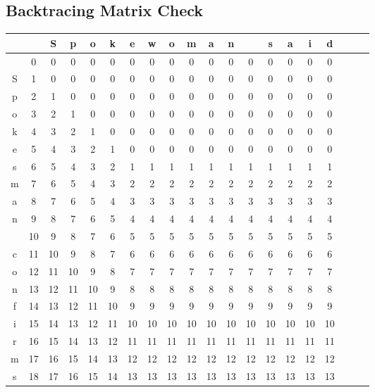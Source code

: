 \subsection{Backtracing Matrix Check}
\begin{tabular}{||c|c c c c c c c c c c c c c c c c |c |c| c|}
\hline
     &     &  S  &  p  &  o  &  k  &  e  &  w  &  o  &  m  &  a  &  n  &     &  s  &  a  &  i  &  d  \\
\hline
\hline
     &  0  &  0  &  0  &  0  &  0  &  0  &  0  &  0  &  0  &  0  &  0  &  0  &  0  &  0  &  0  &  0  \\
  S  &  1  &  0  &  0  &  0  &  0  &  0  &  0  &  0  &  0  &  0  &  0  &  0  &  0  &  0  &  0  &  0  \\
  p  &  2  &  1  &  0  &  0  &  0  &  0  &  0  &  0  &  0  &  0  &  0  &  0  &  0  &  0  &  0  &  0  \\
  o  &  3  &  2  &  1  &  0  &  0  &  0  &  0  &  0  &  0  &  0  &  0  &  0  &  0  &  0  &  0  &  0  \\
  k  &  4  &  3  &  2  &  1  &  0  &  0  &  0  &  0  &  0  &  0  &  0  &  0  &  0  &  0  &  0  &  0  \\
  e  &  5  &  4  &  3  &  2  &  1  &  0  &  0  &  0  &  0  &  0  &  0  &  0  &  0  &  0  &  0  &  0  \\
  s  &  6  &  5  &  4  &  3  &  2  &  1  &  1  &  1  &  1  &  1  &  1  &  1  &  1  &  1  &  1  &  1  \\
  m  &  7  &  6  &  5  &  4  &  3  &  2  &  2  &  2  &  2  &  2  &  2  &  2  &  2  &  2  &  2  &  2  \\
  a  &  8  &  7  &  6  &  5  &  4  &  3  &  3  &  3  &  3  &  3  &  3  &  3  &  3  &  3  &  3  &  3  \\
  n  &  9  &  8  &  7  &  6  &  5  &  4  &  4  &  4  &  4  &  4  &  4  &  4  &  4  &  4  &  4  &  4  \\
     &  10  &  9  &  8  &  7  &  6  &  5  &  5  &  5  &  5  &  5  &  5  &  5  &  5  &  5  &  5  &  5  \\
  c  &  11  &  10  &  9  &  8  &  7  &  6  &  6  &  6  &  6  &  6  &  6  &  6  &  6  &  6  &  6  &  6  \\
  o  &  12  &  11  &  10  &  9  &  8  &  7  &  7  &  7  &  7  &  7  &  7  &  7  &  7  &  7  &  7  &  7  \\
  n  &  13  &  12  &  11  &  10  &  9  &  8  &  8  &  8  &  8  &  8  &  8  &  8  &  8  &  8  &  8  &  8  \\
  f  &  14  &  13  &  12  &  11  &  10  &  9  &  9  &  9  &  9  &  9  &  9  &  9  &  9  &  9  &  9  &  9  \\
  i  &  15  &  14  &  13  &  12  &  11  &  10  &  10  &  10  &  10  &  10  &  10  &  10  &  10  &  10  &  10  &  10  \\
  r  &  16  &  15  &  14  &  13  &  12  &  11  &  11  &  11  &  11  &  11  &  11  &  11  &  11  &  11  &  11  &  11  \\
  m  &  17  &  16  &  15  &  14  &  13  &  12  &  12  &  12  &  12  &  12  &  12  &  12  &  12  &  12  &  12  &  12  \\
  s  &  18  &  17  &  16  &  15  &  14  &  13  &  13  &  13  &  13  &  13  &  13  &  13  &  13  &  13  &  13  &  13  \\
  \hline
\end{tabular}
